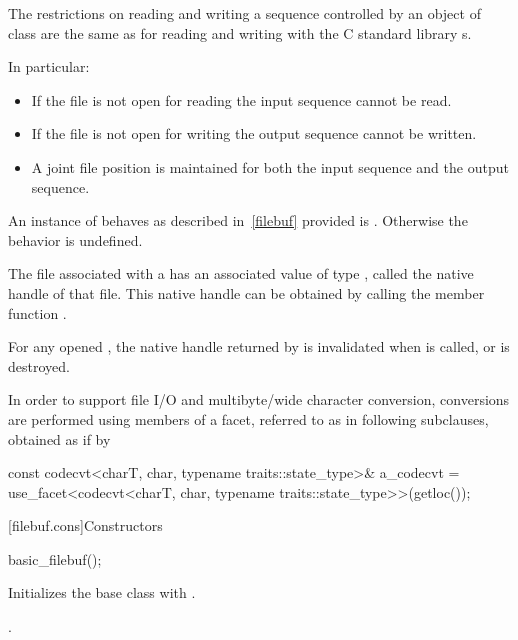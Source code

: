 \pnum
The restrictions on reading and writing a sequence controlled by an
object of class
are the same as for reading and writing with the C standard library
s.

\pnum
In particular:
\begin{itemize}
\item
If the file is not open for reading the input sequence
cannot be read.
\item
If the file is not open for writing the output
sequence cannot be written.
\item
A joint file position is maintained for both the input sequence and
the output sequence.
\end{itemize}

\pnum
An instance of
behaves as described in~\ref{filebuf} provided
is
.
Otherwise the behavior is undefined.

\pnum
The file associated with a  has
an associated value of type ,
called the native handle of that file.
This native handle can be obtained by calling
the member function .

\pnum
For any opened ,
the native handle returned by  is
invalidated when  is called, or  is destroyed.

\pnum
In order to support file I/O and multibyte/wide character conversion,
conversions are performed using members of a facet, referred to as
 in following subclauses, obtained as if by
\begin{codeblock}
const codecvt<charT, char, typename traits::state_type>& a_codecvt =
  use_facet<codecvt<charT, char, typename traits::state_type>>(getloc());
\end{codeblock}

[filebuf.cons]{Constructors}

%
\begin{itemdecl}
basic_filebuf();
\end{itemdecl}

\begin{itemdescr}
\pnum
\effects
Initializes the base class with
.

\pnum
\ensures
{}.
\end{itemdescr}

